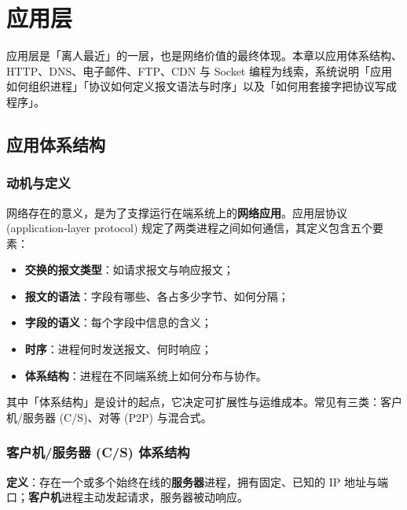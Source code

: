 \clearpage
\begingroup
\let\clearpage\relax
\let\cleardoublepage\relax
\vspace*{\fill}
\chapter{应用层}
\begin{center}
应用层是「离人最近」的一层，也是网络价值的最终体现。本章以应用体系结构、HTTP、DNS、电子邮件、FTP、CDN 与 Socket 编程为线索，系统说明「应用如何组织进程」「协议如何定义报文语法与时序」以及「如何用套接字把协议写成程序」。
\end{center}
\vspace*{\fill}
\endgroup
\clearpage

\section{应用体系结构}

\subsection{动机与定义}

网络存在的意义，是为了支撑运行在端系统上的\textbf{网络应用}。应用层协议 (application-layer protocol) 规定了两类进程之间如何通信，其定义包含五个要素：

\begin{itemize}
    \item \textbf{交换的报文类型}：如请求报文与响应报文；
    \item \textbf{报文的语法}：字段有哪些、各占多少字节、如何分隔；
    \item \textbf{字段的语义}：每个字段中信息的含义；
    \item \textbf{时序}：进程何时发送报文、何时响应；
    \item \textbf{体系结构}：进程在不同端系统上如何分布与协作。
\end{itemize}

其中「体系结构」是设计的起点，它决定可扩展性与运维成本。常见有三类：客户机/服务器 (C/S)、对等 (P2P) 与混合式。

\subsection{客户机/服务器 (C/S) 体系结构}

\textbf{定义}：存在一个或多个始终在线的\textbf{服务器}进程，拥有固定、已知的 IP 地址与端口；\textbf{客户机}进程主动发起请求，服务器被动响应。

